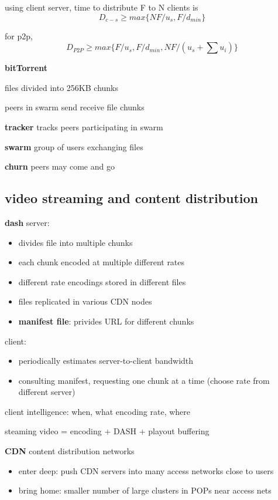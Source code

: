 \documentclass[10pt]{article}
\theoremstyle{break}
\begin{document}
using client server, time to distribute F to N clients is 
$$D_{c-s} \geq max\{NF/u_s, F/d_{min}\}$$

for p2p,
$$D_{P2P} \geq max\{F/u_s, F/d_{min}, NF/(u_s+\sum u_i)\}$$

\textbf{bitTorrent}

files divided into 256KB chunks 

peers in swarm send receive file chunks 

\textbf{tracker} tracks peers participating in swarm

\textbf{swarm} group of users exchanging files

\textbf{churn} peers may come and go

\subsection{video streaming and content distribution}
\textbf{dash}
server:
\begin{itemize}
    \item divides file into multiple chunks 
    \item each chunk encoded at multiple different rates 
    \item different rate encodings stored in different files 
    \item files replicated in various CDN nodes 
    \item \textbf{manifest file}: privides URL for different chunks
\end{itemize}

client: 
\begin{itemize}
    \item periodically estimates server-to-client bandwidth 
    \item consulting manifest, requesting one chunk at a time (choose rate from different server)
\end{itemize}

client intelligence: when, what encoding rate, where

steaming video = encoding + DASH + playout buffering 

\textbf{CDN} content distribution networks 

\begin{itemize}
    \item enter deep: push CDN servers into many access networks close to users 
    \item bring home: smaller number of large clusters in POPs near access nets 
\end{itemize}
\end{document}
